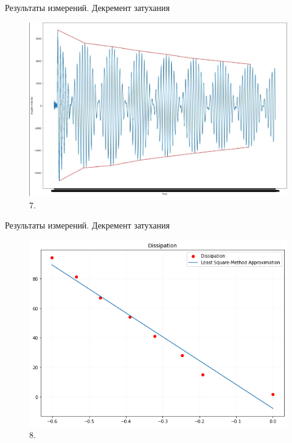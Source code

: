 \documentclass[xcolor=table]{beamer}
\begin{document}
\begin{frame}{Результаты измерений. Декремент затухания}
    \begin{figure}[h]
        \centering
        \includegraphics[scale = 0.28]{decrement.jpg}
        \caption{7. }
        \label{}
    \end{figure}
\end{frame}

\begin{frame}{Результаты измерений. Декремент затухания}
    \begin{figure}
            \includegraphics[width=0.9\linewidth]{images/Diss.png}
            \caption{8. }
            \label{fig:4}
    \end{figure}
\end{frame}
\end{document}

